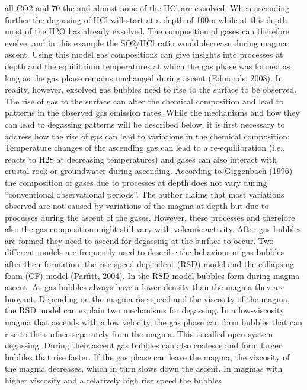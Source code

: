 \documentclass  [
  paper    = a4,
  BCOR     = 10mm,
  twoside,
  fontsize = 12pt,
  fleqn,
  toc      = bibnumbered,
  toc      = listofnumbered,
  numbers  = noendperiod,
  headings = normal,
  listof   = leveldown,
  version  = 3.03
]                                       {scrreprt}
\begin{document}
	all CO2 and 70%
	the  and almost none of the HCl are exsolved. When ascending further the
	degassing of HCl will start at a depth of 100m while at this depth most of the
	H2O has already exsolved. The composition of gases can therefore evolve, and
	in this example the SO2/HCl ratio would decrease during magma ascent. Using
	this model gas compositions can give insights into processes at depth and the
	equilibrium temperatures at which the gas phase was formed as long as the gas
	phase remains unchanged during ascent (Edmonds, 2008).
	In reality, however, exsolved gas bubbles need to rise to the surface to be
	observed. The rise of gas to the surface can alter the chemical composition
	and lead to patterns in the observed gas emission rates. While the mechanisms
	and how they can lead to degassing patterns will be described below, it is
	first necessary to address how the rise of gas can lead to variations in the
	chemical composition: Temperature changes of the ascending gas can lead to a
	re-equilibration (i.e.,  reacts to H2S at decreasing temperatures) and gases
	can also interact with crustal rock or groundwater during ascending. According
	to Giggenbach (1996) the composition of gases due to processes at depth does
	not vary during “conventional observational periods”. The author claims that
	most variations observed are not caused by variations of the magma at depth
	but due to processes during the ascent of the gases. However, these processes
	and therefore also the gas composition might still vary with volcanic activity.
	After gas bubbles are formed they need to ascend for degassing at the surface
	to occur. Two different models are frequently used to describe the behaviour
	of gas bubbles after their formation: the rise speed dependent (RSD) model
	and the collapsing foam (CF) model (Parfitt, 2004). In the RSD model bubbles
	form during magma ascent. As gas bubbles always have a lower density than the
	magma they are buoyant. Depending on the magma rise speed and the viscosity
	of the magma, the RSD model can explain two mechanisms for degassing.
	In a low-viscosity magma that ascends with a low velocity, the gas phase can
	form bubbles that can rise to the surface separately from the magma. This is
	called open-system degassing. During their ascent gas bubbles can also coalesce
	and form larger bubbles that rise faster. If the gas phase can leave the magma,
	the viscosity of the magma decreases, which in turn slows down the ascent.
	In magmas with higher viscosity and a relatively high rise speed the bubbles
\end{document}
